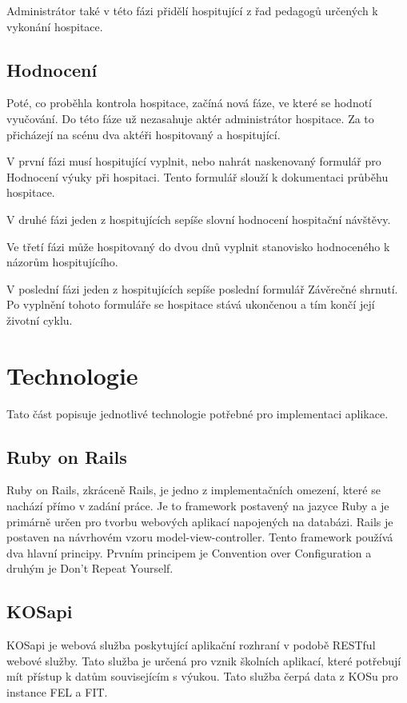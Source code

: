 Administrátor také v této fázi přidělí hospitující z řad pedagogů určených k vykonání hospitace.  
 
\subsection{Hodnocení}
Poté, co proběhla kontrola hospitace, začíná nová fáze, ve které se hodnotí vyučování. Do této fáze už nezasahuje aktér administrátor hospitace. Za to přicházejí na scénu dva aktéři hospitovaný a hospitující.

V první fázi musí hospitující vyplnit, nebo nahrát naskenovaný formulář pro Hodnocení výuky při hospitaci. Tento formulář slouží k dokumentaci průběhu hospitace.

V druhé fázi jeden z hospitujících sepíše slovní hodnocení hospitační návštěvy.

Ve třetí fázi může hospitovaný do dvou dnů vyplnit stanovisko hodnoceného k názorům hospitujícího.  

V poslední fázi jeden z hospitujících sepíše poslední formulář Závěrečné shrnutí. Po vyplnění tohoto formuláře se hospitace stává ukončenou a tím končí její životní cyklu.
 
\section{Technologie}
Tato část popisuje jednotlivé technologie potřebné pro implementaci aplikace.

\subsection{Ruby on Rails}
Ruby on Rails, zkráceně Rails, je jedno z implementačních omezení, které se nachází přímo v zadání práce. Je to framework postavený na jazyce Ruby a je primárně určen pro tvorbu webových aplikací napojených na databázi. Rails je postaven na návrhovém vzoru model-view-controller. Tento framework používá dva hlavní principy. Prvním principem je Convention over Configuration a druhým je Don’t Repeat Yourself.

\subsection{KOSapi}
KOSapi je webová služba poskytující aplikační rozhraní v podobě RESTful webové služby. Tato služba je určená pro vznik školních aplikací, které potřebují mít přístup k datům souvisejícím s výukou. Tato služba čerpá data z KOSu pro instance FEL a FIT.

